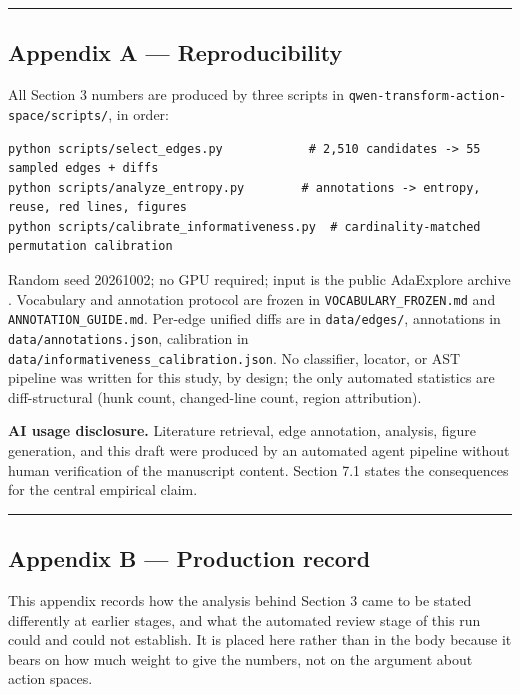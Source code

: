 \documentclass[
  11pt,
]{article}
\begin{document}
\begin{center}\rule{0.5\linewidth}{0.5pt}\end{center}

\hypertarget{appendix-a-reproducibility}{%
\subsection{Appendix A --- Reproducibility}\label{appendix-a-reproducibility}}

All Section 3 numbers are produced by three scripts in \texttt{qwen-transform-action-space/scripts/}, in order:

\begin{verbatim}
python scripts/select_edges.py            # 2,510 candidates -> 55 sampled edges + diffs
python scripts/analyze_entropy.py        # annotations -> entropy, reuse, red lines, figures
python scripts/calibrate_informativeness.py  # cardinality-matched permutation calibration
\end{verbatim}

Random seed 20261002; no GPU required; input is the public AdaExplore archive \cite{adaexplore3}. Vocabulary and annotation protocol are frozen in \texttt{VOCABULARY\_FROZEN.md} and \texttt{ANNOTATION\_GUIDE.md}. Per-edge unified diffs are in \texttt{data/edges/}, annotations in \texttt{data/annotations.json}, calibration in \texttt{data/informativeness\_calibration.json}. No classifier, locator, or AST pipeline was written for this study, by design; the only automated statistics are diff-structural (hunk count, changed-line count, region attribution).

\textbf{AI usage disclosure.} Literature retrieval, edge annotation, analysis, figure generation, and this draft were produced by an automated agent pipeline without human verification of the manuscript content. Section 7.1 states the consequences for the central empirical claim.

\begin{center}\rule{0.5\linewidth}{0.5pt}\end{center}

\hypertarget{appendix-b-production-record}{%
\subsection{Appendix B --- Production record}\label{appendix-b-production-record}}

This appendix records how the analysis behind Section 3 came to be stated differently at earlier stages, and what the automated review stage of this run could and could not establish. It is placed here rather than in the body because it bears on how much weight to give the numbers, not on the argument about action spaces.
\end{document}
